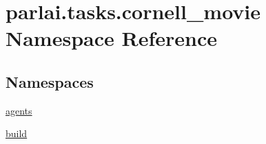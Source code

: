 \hypertarget{namespaceparlai_1_1tasks_1_1cornell__movie}{}\section{parlai.\+tasks.\+cornell\+\_\+movie Namespace Reference}
\label{namespaceparlai_1_1tasks_1_1cornell__movie}
\subsection*{Namespaces}
\begin{DoxyCompactItemize}
\item 
 \hyperlink{namespaceparlai_1_1tasks_1_1cornell__movie_1_1agents}{agents}
\item 
 \hyperlink{namespaceparlai_1_1tasks_1_1cornell__movie_1_1build}{build}
\end{DoxyCompactItemize}
